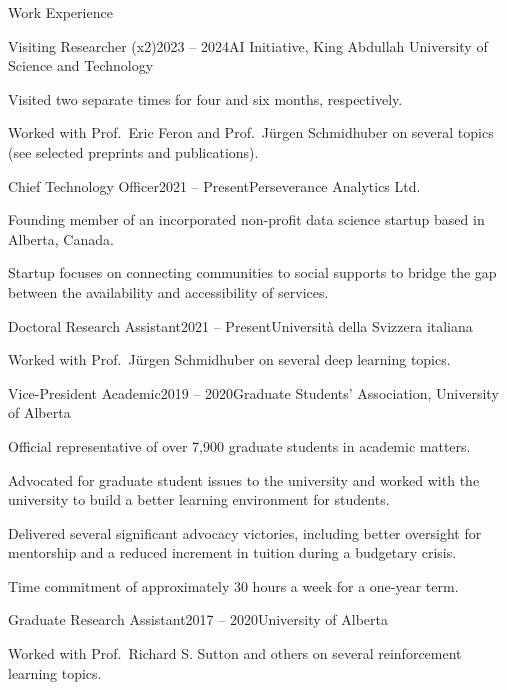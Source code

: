 \documentclass{cv}
\begin{document}
\begin{rSection}{Work Experience}

\begin{rSubsection}{Visiting Researcher (x2)}{2023 -- 2024}{AI Initiative, King Abdullah University of Science and Technology}
    \item Visited two separate times for four and six months, respectively.
    \item Worked with Prof.\ Eric Feron and Prof.\ J{\"{u}}rgen Schmidhuber on several topics (see selected preprints and publications).
\end{rSubsection}

\begin{rSubsection}{Chief Technology Officer}{2021 -- Present}{Perseverance Analytics Ltd.}
    \item Founding member of an incorporated non-profit data science startup based in Alberta, Canada.
    \item Startup focuses on connecting communities to social supports to bridge the gap between the availability and accessibility of services.
\end{rSubsection}

\begin{rSubsection}{Doctoral Research Assistant}{2021 -- Present}{Universit{\`{a}} della Svizzera italiana}
    \item Worked with Prof.\ J{\"{u}}rgen Schmidhuber on several deep learning topics.
\end{rSubsection}

\begin{rSubsection}{Vice-President Academic}{2019 -- 2020}{Graduate Students' Association, University of Alberta}
    \item Official representative of over 7,900 graduate students in academic matters.
    \item Advocated for graduate student issues to the university and worked with the university to build a better learning environment for students.
    \item Delivered several significant advocacy victories, including better oversight for mentorship and a reduced increment in tuition during a budgetary crisis.
    \item Time commitment of approximately 30 hours a week for a one-year term.
\end{rSubsection}

\begin{rSubsection}{Graduate Research Assistant}{2017 -- 2020}{University of Alberta}
    \item Worked with Prof.\ Richard S. Sutton and others on several reinforcement learning topics.
\end{rSubsection}


\end{rSection}
\end{document}
